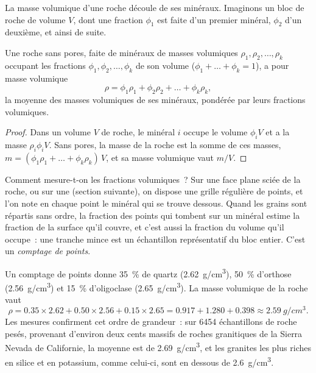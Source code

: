 La masse volumique d'une roche découle de ses minéraux. Imaginons un bloc de
roche de volume $V$, dont une fraction $\phi_1$ est faite d'un premier
minéral, $\phi_2$ d'un deuxième, et ainsi de suite.

\begin{proposition}\label{prop:g11:minerals:density}
Une roche sans pores, faite de minéraux de masses volumiques $\rho_1, \rho_2, \dots,
\rho_k$ occupant les fractions $\phi_1, \phi_2, \dots, \phi_k$ de son volume
($\phi_1 + \dots + \phi_k = 1$), a pour masse volumique
\[
  \rho = \phi_1 \rho_1 + \phi_2 \rho_2 + \dots + \phi_k \rho_k ,
\]
la moyenne des masses volumiques de ses minéraux, pondérée par leurs
fractions volumiques.
\end{proposition}

\begin{proof}
Dans un volume $V$ de roche, le minéral $i$ occupe le volume $\phi_i V$ et a
la masse $\rho_i \phi_i V$. Sans pores, la masse de la roche est la somme de
ces masses, $m = (\phi_1 \rho_1 + \dots + \phi_k \rho_k)\,V$, et sa masse
volumique vaut $m/V$.
\end{proof}

Comment mesure-t-on les fractions volumiques~? Sur une face plane sciée de
la roche, ou sur une  (section suivante), on dispose une grille
régulière de points, et l'on note en chaque point le minéral qui se trouve
dessous. Quand les grains sont répartis sans ordre, la fraction des points
qui tombent sur un minéral estime la fraction de la surface qu'il couvre, et
c'est aussi la fraction du volume qu'il occupe~: une tranche mince est un
échantillon représentatif du bloc entier. C'est un \emph{comptage de
points}.

\begin{example}
Un comptage de points donne \qty{35}{\percent} de quartz (\qty{2.62}{g/cm^3}),
\qty{50}{\percent} d'orthose (\qty{2.56}{g/cm^3}) et \qty{15}{\percent}
d'oligoclase (\qty{2.65}{g/cm^3}). La masse volumique de la roche vaut
\[
  \rho = 0.35 \times 2.62 + 0.50 \times 2.56 + 0.15 \times 2.65
       = 0.917 + 1.280 + 0.398 \approx \qty{2.59}{g/cm^3}.
\]
Les mesures confirment cet ordre de grandeur~: sur \num{6454} échantillons
de roche pesés, provenant d'environ deux cents massifs de roches granitiques
de la Sierra Nevada de Californie, la moyenne est de \qty{2.69}{g/cm^3}, et
les granites les plus riches en silice et en potassium, comme celui-ci, sont
en dessous de \qty{2.6}{g/cm^3}.
\end{example}

